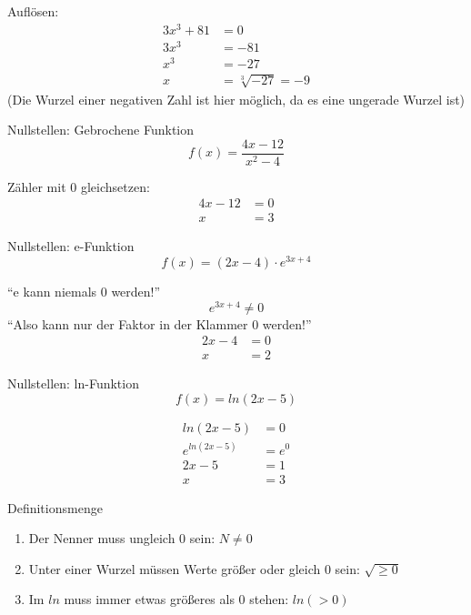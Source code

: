 \begin{antwort}Auflösen:
	\begin{align*}
		3x^3+81&=0 \\
		3x^3&=-81 \\
		x^3&=-27 \\
		x&=\sqrt[3]{-27}=-9
	\end{align*}
	\normalsize
	(Die Wurzel einer negativen Zahl ist hier möglich, da es eine ungerade Wurzel ist)\end{antwort}
\begin{frage}Nullstellen: Gebrochene Funktion
	\[
	f(x)=\frac{4x-12}{x^2-4}
	\]\end{frage}
\begin{antwort}Zähler mit 0 gleichsetzen:
	\begin{align*}
	4x-12&=0 \\
	x&=3
	\end{align*}\end{antwort}
\begin{frage}Nullstellen: e-Funktion
	\[
	f(x)=(2x-4)\cdot{e^{3x+4}}
	\]\end{frage}
\begin{antwort}"`e kann niemals 0 werden!"'
	\[
	{e^{3x+4}}\neq0
	\]
	"`Also kann nur der Faktor in der Klammer 0 werden!"'
	\begin{align*}
	2x-4&=0 \\
	x&=2
	\end{align*}\end{antwort}
\begin{frage}Nullstellen: ln-Funktion
	\[
	f(x)=ln(2x-5)
	\]\end{frage}
\begin{antwort}\begin{align*}
		ln(2x-5)&=0\\
		{e^{ln(2x-5)}}&=e^0\\
		2x-5&=1\\
		x&=3
	\end{align*}\end{antwort}
\begin{frage}Definitionsmenge\end{frage}
\begin{antwort}\begin{enumerate}
		\item Der Nenner muss ungleich 0 sein: $N \neq 0$
		\item Unter einer Wurzel müssen Werte größer oder gleich 0 sein: $\sqrt{\ge 0}$
		\item Im $ln$ muss immer etwas größeres als 0 stehen: $ln(>0)$
	\end{enumerate}\end{antwort}
